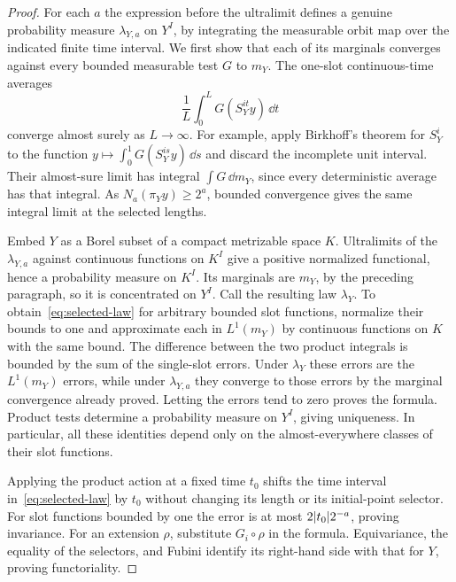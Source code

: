 \begin{proof}
For each $a$ the expression before the ultralimit defines a genuine
probability measure $\lambda_{Y,a}$ on $Y^I$, by integrating the
measurable orbit map over the indicated finite time interval.  We
first show that each of its marginals converges against every bounded
measurable test $G$ to $m_Y$.  The one-slot continuous-time averages
\[
 \frac1L\int_0^L G(S_Y^{it}y)\,\dd t
\]
converge almost surely as $L\to\infty$.  For example, apply Birkhoff's
theorem for $S_Y^i$ to the function
$y\mapsto\int_0^1G(S_Y^{is}y)\,\dd s$ and discard the incomplete
unit interval.  Their almost-sure limit has integral $\int G\,\dd m_Y$,
since every deterministic average has that integral.  As
$N_a(\pi_Yy)\ge2^a$, bounded convergence gives the same integral
limit at the selected lengths.

Embed $Y$ as a Borel subset of a compact metrizable space $K$.
Ultralimits of the $\lambda_{Y,a}$ against continuous functions on
$K^I$ give a positive normalized functional, hence a probability
measure on $K^I$.  Its marginals are $m_Y$, by the preceding paragraph,
so it is concentrated on $Y^I$.  Call the resulting law $\lambda_Y$.
To obtain~\eqref{eq:selected-law} for arbitrary bounded slot functions,
normalize their bounds to one and approximate each in $L^1(m_Y)$ by
continuous functions on $K$ with the same bound.  The difference
between the two product integrals is bounded by the sum of the
single-slot errors.  Under $\lambda_Y$ these errors are the
$L^1(m_Y)$ errors, while under $\lambda_{Y,a}$ they converge to those
errors by the marginal convergence already proved.  Letting the
errors tend to zero proves the formula.  Product tests determine a
probability measure on $Y^I$, giving uniqueness.  In particular, all
these identities depend only on the almost-everywhere classes of
their slot functions.

Applying the product action at a fixed time $t_0$ shifts the time
interval in~\eqref{eq:selected-law} by $t_0$ without changing its
length or its initial-point selector.  For slot functions bounded by
one the error is at most $2\lvert t_0\rvert2^{-a}$, proving invariance.
For an extension $\rho$, substitute $G_i\circ\rho$ in the formula.
Equivariance, the equality of the selectors, and Fubini identify its
right-hand side with that for $Y$, proving functoriality.


\end{proof}
